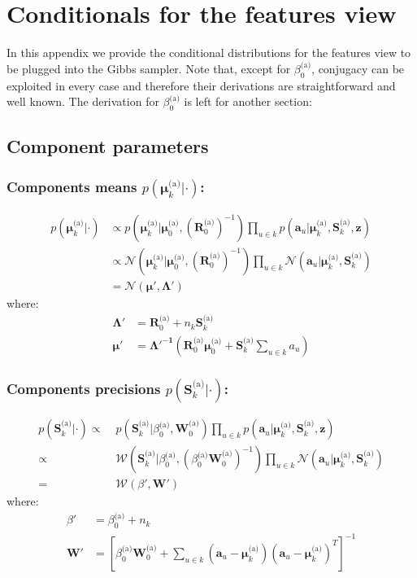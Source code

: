 \documentclass[smallextended]{svjour3}          %
\newcommand{\Muo}{\boldsymbol{\mu}_{0}^\text{(a)}}
\newcommand{\Ro}{\mathbf{R}_{0}^\text{(a)}}
\newcommand{\invRo}{\left(\mathbf{R}_{0}^\text{(a)}\right)^{-1}}
\newcommand{\Wo}{\mathbf{W}_{0}^\text{(a)}}
\newcommand{\betaoa}{\beta_{0}^\text{(a)}}
\newcommand{\Muk}{\boldsymbol{\mu}_{k}^\text{(a)}}
\newcommand{\Sk}{\mathbf{S}_{k}^\text{(a)}}
\begin{document}
\section{Conditionals for the features view}
In this appendix we provide the conditional distributions for the features view to be plugged into the Gibbs sampler. Note that, except for $\betaoa$, conjugacy can be exploited in every case and therefore their derivations are straightforward and well known. The derivation for $\betaoa$ is left for another section:
\subsection{Component parameters}
\subsubsection*{Components means $p(\Muk | \cdot )$:}
\begin{align*}
p(\Muk | \cdot ) 
&\propto
p\left(\Muk | \Muo, \invRo\right) 
\prod_{u \in k} p\left(\mathbf{a}_u | \Muk, \Sk, \mathbf{z}\right)\\
&\propto
\mathcal{N}\left(\Muk | \Muo, \invRo\right) 
\prod_{u \in k} \mathcal{N}\left(\mathbf{a}_u | \Muk, \Sk\right)\\
&=
\mathcal{N}(\boldsymbol{\mu', \Lambda'})
\end{align*}
where:
\begin{align*}
\boldsymbol{\Lambda'} &= \Ro + n_k \Sk\\ 
\boldsymbol{\mu'} &= \boldsymbol{\Lambda'^{-1}} \left(\Ro \Muo + \Sk \sum_{u\in k} a_u\right)
\end{align*}

\subsubsection*{Components precisions $p(\Sk | \cdot )$:}
\begin{align*}
p(\Sk | \cdot ) 
\propto\;& 
p\left(\Sk |\betaoa, \Wo\right)
\prod_{u \in k} p\left(\mathbf{a}_u | \Muk, \Sk, \mathbf{z}\right)\\
\propto\;&
\mathcal{W}\left(\Sk |\betaoa, (\betaoa
\Wo)^{-1}\right)%
\prod_{u \in k} \mathcal{N}\left(\mathbf{a}_u | \Muk, \Sk\right)\\
=\;& \mathcal{W}(\beta', \mathbf{W}')
\end{align*}
where:
\begin{align*}
\beta' &= \betaoa + n_k\\
\mathbf{W}' &= 
\left[ \betaoa\Wo + \sum_{u \in k} (\mathbf{a}_u - \Muk)(\mathbf{a}_u- \Muk)^T  \right]^{-1}
\end{align*}
\end{document}
